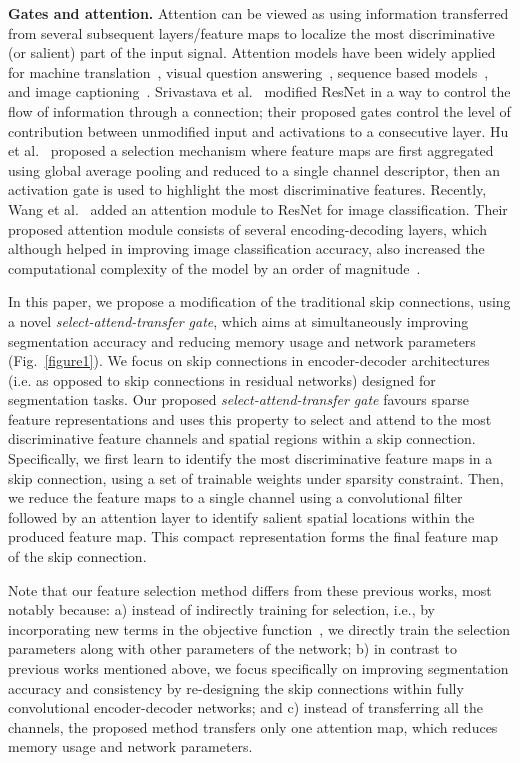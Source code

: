 \documentclass{article}
\begin{document}
\textbf{Gates and attention.} Attention can be viewed as using information transferred from several subsequent layers/feature maps to localize the most discriminative (or salient) part of the input signal. Attention models have been widely applied for machine translation~\cite{bahdanau2014neural}, visual question answering~\cite{das2017human}, sequence based models~\cite{luong2015effective}, and image captioning~\cite{xu2015show}. Srivastava et al.~\cite{srivastava2015highway} modified ResNet in a way to control the flow of information through a connection; their proposed gates control the level of contribution between unmodified input and activations to a consecutive layer. Hu et al.~\cite{hu2017squeeze} proposed a selection mechanism where feature maps are first aggregated using global average pooling and reduced to a single channel descriptor, then an activation gate is used to highlight the most discriminative features. Recently, Wang et al.~\cite{wang2017residual} added an attention module to ResNet for image classification. Their proposed attention module consists of several encoding-decoding layers, which although helped in improving image classification accuracy, also increased the computational complexity of the model by an order of magnitude~\cite{wang2017residual}.

In this paper, we propose a modification of the traditional skip connections, using a novel \emph{select-attend-transfer gate}, which aims at simultaneously improving segmentation accuracy and reducing memory usage and network parameters (Fig.~\ref{figure1}). We focus on skip connections in encoder-decoder architectures (i.e. as opposed to skip connections in residual networks) designed for segmentation tasks. Our proposed \emph{select-attend-transfer gate} favours sparse feature representations and uses this property to select and attend to the most discriminative feature channels and spatial regions within a skip connection. Specifically, we first learn to identify the most discriminative feature maps in a skip connection, using a set of trainable weights under sparsity constraint. Then, we reduce the feature maps to a single channel using a convolutional filter followed by an attention layer to identify salient spatial locations within the produced feature map. This compact representation forms the final feature map of the skip connection. 

Note that our feature selection method differs from these previous works, most notably because: a) instead of indirectly training for selection, i.e., by incorporating new terms in the objective function~\cite{wen2016learning}, we directly train the selection parameters along with other parameters of the network; b) in contrast to previous works mentioned above, we focus specifically on improving segmentation accuracy and consistency by re-designing the skip connections within fully convolutional encoder-decoder networks; and c) instead of transferring all the channels, the proposed method transfers only one attention map, which reduces memory usage and network parameters.
\end{document}
